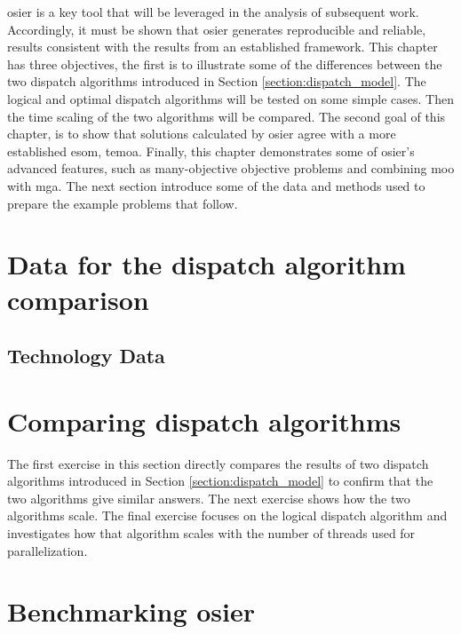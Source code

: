 \ac{osier} is a key tool that will be leveraged in the analysis of subsequent
work. Accordingly, it must be shown that \ac{osier} generates reproducible and
reliable, results consistent with the results from an established framework.
This chapter has three objectives, the first is to illustrate some of the
differences between the two dispatch algorithms introduced in Section
\ref{section:dispatch_model}. The logical and optimal dispatch algorithms will
be tested on some simple cases. Then the time scaling of the two algorithms will
be compared. The second goal of this chapter, is to show that solutions
calculated by \ac{osier} agree with a more established \ac{esom}, \ac{temoa}.
Finally, this chapter demonstrates some of \ac{osier}'s advanced features, such
as many-objective objective problems and combining \ac{moo} with \ac{mga}.
The next section introduce some of the data and methods used to prepare the 
example problems that follow.

\section{Data for the dispatch algorithm comparison}
\subsection{Technology Data}


\section{Comparing dispatch algorithms}
The first exercise in this section directly compares the results of two dispatch algorithms
introduced in Section \ref{section:dispatch_model} to confirm that the two algorithms
give similar answers. The next exercise shows how the two algorithms scale. The final exercise
focuses on the logical dispatch algorithm and investigates how that algorithm scales with the
number of threads used for parallelization.
% 

\section{Benchmarking \ac{osier}}




